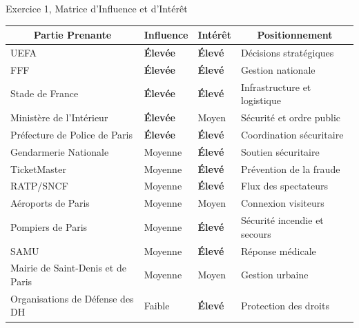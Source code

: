 \documentclass[aspectratio=1610]{beamer}
\begin{document}
    \begin{frame}{Exercice 1, Matrice d'Influence et d'Intérêt}
        \begin{table}[]
            \begin{tabular}{llll}
            \hline
            \multicolumn{1}{c}{Partie Prenante}             & \multicolumn{1}{c}{Influence} & \multicolumn{1}{c}{Intérêt} & \multicolumn{1}{c}{Positionnement}  \\ \hline\hline
                        UEFA                                & \textbf{Élevée}               & \textbf{Élevé}              & Décisions stratégiques              \\
                        FFF                                 & \textbf{Élevée}               & \textbf{Élevé}              & Gestion nationale                   \\
                        Stade de France                     & \textbf{Élevée}               & \textbf{Élevé}              & Infrastructure et logistique        \\
                        Ministère de l'Intérieur            & \textbf{Élevée}               & Moyen                       & Sécurité et ordre public            \\
                        Préfecture de Police de Paris       & \textbf{Élevée}               & \textbf{Élevé}              & Coordination sécuritaire            \\
                        Gendarmerie Nationale               & Moyenne                       & \textbf{Élevé}              & Soutien sécuritaire                 \\
                        TicketMaster                        & Moyenne                       & \textbf{Élevé}              & Prévention de la fraude             \\
                        RATP/SNCF                           & Moyenne                       & \textbf{Élevé}              & Flux des spectateurs                \\
                        Aéroports de Paris                  & Moyenne                       & Moyen                       & Connexion visiteurs                 \\
                        Pompiers de Paris                   & Moyenne                       & \textbf{Élevé}              & Sécurité incendie et secours        \\
                        SAMU                                & Moyenne                       & \textbf{Élevé}              & Réponse médicale                    \\
                        Mairie de Saint-Denis et de Paris   & Moyenne                       & Moyen                       & Gestion urbaine                     \\
                        Organisations de Défense des DH     & Faible                        & \textbf{Élevé}              & Protection des droits               \\ \hline
            \end{tabular}
        \end{table}
    \end{frame}
\end{document}

